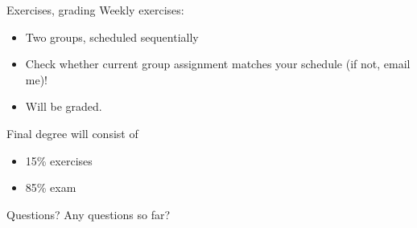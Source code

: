 \begin{frame}{Exercises, grading}
  Weekly exercises:
  \begin{itemize}
    \item Two groups, scheduled sequentially
    \item Check whether current group assignment matches your schedule (if not, email me)!
    \item Will be graded.
  \end{itemize}

  \bigskip
  Final degree will consist of
  \begin{itemize}
    \item 15\% exercises
    \item 85\% exam
  \end{itemize}
\end{frame}

\begin{frame}{Questions?}
  Any questions so far?
\end{frame}
